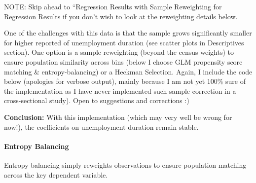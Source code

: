 \documentclass[
]{article}
\newenvironment{Shaded}{\begin{snugshade}}{\end{snugshade}}
\newcommand{\AttributeTok}[1]{\textcolor[rgb]{0.13,0.29,0.53}{#1}}
\newcommand{\CommentTok}[1]{\textcolor[rgb]{0.56,0.35,0.01}{\textit{#1}}}
\newcommand{\DecValTok}[1]{\textcolor[rgb]{0.00,0.00,0.81}{#1}}
\newcommand{\FunctionTok}[1]{\textcolor[rgb]{0.13,0.29,0.53}{\textbf{#1}}}
\newcommand{\NormalTok}[1]{#1}
\newcommand{\OtherTok}[1]{\textcolor[rgb]{0.56,0.35,0.01}{#1}}
\newcommand{\SpecialCharTok}[1]{\textcolor[rgb]{0.81,0.36,0.00}{\textbf{#1}}}
\newcommand{\StringTok}[1]{\textcolor[rgb]{0.31,0.60,0.02}{#1}}
\begin{document}
NOTE: Skip ahead to ``Regression Results with Sample Reweighting for
Regression Results if you don't wish to look at the reweighting details
below.

One of the challenges with this data is that the sample grows
significantly smaller for higher reported of unemployment duration (see
scatter plots in Descriptives section). One option is a sample
reweighting (beyond the census weights) to ensure population similarity
across bins (below I choose GLM propensity score matching \&
entropy-balancing) or a Heckman Selection. Again, I include the code
below (apologies for verbose output), mainly because I am not yet 100\%
sure of the implementation as I have never implemented such sample
correction in a cross-sectional study). Open to suggestions and
corrections :)

\textbf{Conclusion:} With this implementation (which may very well be
wrong for now!), the coefficients on unemployment duration remain
stable.

\paragraph{Entropy Balancing}\label{entropy-balancing}

Entropy balancing simply reweights observations to ensure population
matching across the key dependent variable.

\begin{Shaded}
\end{Shaded}
\end{document}
